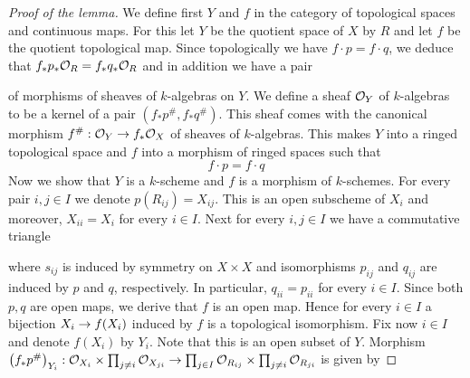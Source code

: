 \begin{proof}[Proof of the lemma]
We define first $Y$ and $f$ in the category of topological spaces and continuous maps. For this let $Y$ be the quotient space of $X$ by $R$ and let $f$ be the quotient topological map. Since topologically we have $f\cdot p = f\cdot q$, we deduce that $f_*p_*{\mathcal O}_R = f_*q_*{\mathcal O}_R$ and in addition we have a pair
\begin{center}
\end{center}
of morphisms of sheaves of $k$-algebras on $Y$. We define a sheaf ${\mathcal O}_Y$ of $k$-algebras to be a kernel of a pair $(f_*p^{\#},f_*q^{\#})$. This sheaf comes with the canonical morphism $f^{\#}:{\mathcal O}_Y\rightarrow f_*{\mathcal O}_X$ of sheaves of $k$-algebras. This makes $Y$ into a ringed topological space and $f$ into a morphism of ringed spaces such that $$f \cdot p = f\cdot q$$
Now we show that $Y$ is a $k$-scheme and $f$ is a morphism of $k$-schemes. For every pair $i,j\in I$ we denote $p(R_{ij}) = X_{ij}$. This is an open subscheme of $X_i$ and moreover, $X_{ii} = X_i$ for every $i\in I$. Next for every $i,j\in I$ we have a commutative triangle
\begin{center}
\end{center}
where $s_{ij}$ is induced by symmetry on $X\times X$ and isomorphisms $p_{ij}$ and $q_{ij}$ are induced by $p$ and $q$, respectively. In particular, $q_{ii} = p_{ii}$ for every $i\in I$. Since both $p, q$ are open maps, we derive that $f$ is an open map. Hence for every $i\in I$ a bijection $X_i\rightarrow f(X_i)$ induced by $f$ is a topological isomorphism. Fix now $i\in I$ and denote $f(X_i)$ by $Y_i$. Note that this is an open subset of $Y$. Morphism $\left(f_*p^{\#}\right)_{Y_i}:{\mathcal O}_{X_i}\times \prod_{j\neq i}{\mathcal O}_{X_{ji}} \rightarrow \prod_{j\in I}{\mathcal O}_{R_{ij}} \times  \prod_{j\neq i}{\mathcal O}_{R_{ji}}$ is given by

\end{proof}
